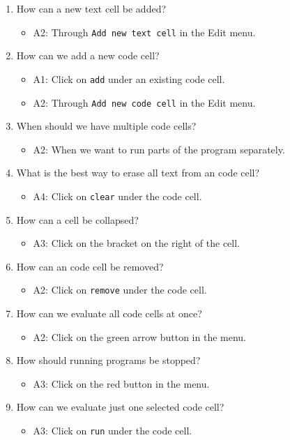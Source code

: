 \documentclass[article,A4,12pt]{llncs}
\begin{document}
\begin{enumerate}
\item How can a new text cell be added?
  \begin{itemize}
    \item A2: Through {\tt Add new text cell} in the Edit menu.
  \end{itemize}
\item How can we add a new code cell?
  \begin{itemize}
    \item A1: Click on {\tt add} under an existing code cell.
    \item A2: Through {\tt Add new code cell} in the Edit menu.
  \end{itemize}
\item When should we have multiple code cells?
  \begin{itemize}
    \item A2: When we want to run parts of the program separately.
  \end{itemize}
\item What is the best way to erase all text from an code cell?
  \begin{itemize}
    \item A4: Click on {\tt clear} under the code cell.
  \end{itemize}
\item How can a cell be collapsed?
  \begin{itemize}
    \item A3: Click on the bracket on the right of the cell.
  \end{itemize}
\item How can an code cell be removed?
  \begin{itemize}
    \item A2: Click on {\tt remove} under the code cell.
  \end{itemize}
\item How can we evaluate all code cells at once?
  \begin{itemize}
    \item A2: Click on the green arrow button in the menu.
  \end{itemize}
\item How should running programs be stopped?
  \begin{itemize}
    \item A3: Click on the red button in the menu.
  \end{itemize}
\item How can we evaluate just one selected code cell?
  \begin{itemize}
    \item A3: Click on {\tt run} under the code cell.
  \end{itemize}
\end{enumerate}
\end{document}
